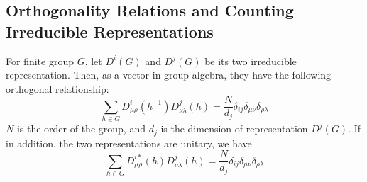 \subsection{Orthogonality Relations and Counting Irreducible
    Representations}
\label{sec:Orthogonality-Relations-and-Counting-Irreducible-Representations}

\begin{thm}
    For finite group $G$, let $D^i(G)$ and $D^j(G)$ be its two
    irreducible representation. Then, as a vector in group algebra,
    they have the following orthogonal
    relationship:
    \begin{equation}
        \sum_{h\in G} D^{i}_{\mu\rho}(h^{-1})D^j_{\nu \lambda}(h) =
        \frac{N}{d_j} \delta_{ij} \delta_{\mu\nu}\delta_{\rho\lambda}
    \end{equation}
    $N$ is the order of the group, and $d_j$ is the
    dimension of representation $D^j(G)$. If in addition, the two
    representations are unitary, we have
    \begin{equation}
        \sum_{h\in G} D^{i*}_{\mu\rho}(h)D^j_{\nu \lambda}(h) =
        \frac{N}{d_j} \delta_{ij} \delta_{\mu\nu}\delta_{\rho\lambda}
    \end{equation}
\end{thm}
